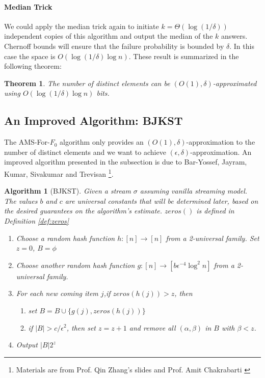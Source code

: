 \documentclass[11pt]{article}
\theoremstyle{plain}
\newtheorem{theorem}{Theorem}[section]
\newtheorem{algorithm}{Algorithm}[section]
\begin{document}
\paragraph{Median Trick}
We could apply the median trick again to initiate $k=\Theta(\log(1/\delta))$ 
independent copies of this algorithm and output the median of the $k$ 
answers. Chernoff bounds will ensure that the failure probability is bounded 
by $\delta$. In this case the space is $O(\log(1/\delta)\log n)$. These result is 
summarized in the following theorem:
\begin{theorem}
The number of distinct elements can be $(O(1),\delta)$-approximated using 
$O(\log(1/\delta)\log n)$ bits.
\end{theorem}

\subsection{An Improved Algorithm: BJKST}
The AMS-For-$F_0$ algorithm only provides an $(O(1),\delta)$-approximation 
to the number of distinct elements and we want to achieve 
$(\epsilon,\delta)$-approximation. An improved algorithm presented in the 
subsection is due to Bar-Yossef, Jayram, Kumar,
Sivakumar and Trevisan  \cite{BJKST02} \footnote{Materials are from Prof. 
Qin Zhang's slides  \cite{zhang2017-slides} and Prof. Amit 
Chakrabarti \cite{Cha2015-notes}}.

\begin{algorithm}[BJKST] Given a stream $\sigma$ assuming 
	vanilla streaming model. The values $b$ and $c$ are universal constants 
	that will be determined later, based on the desired guarantees
	on the algorithm’s estimate. $zeros()$ is defined in 
	Definition  \ref{def:zeros}
	\label{al:bjkst}
	\begin{enumerate}
		\item Choose a random hash function $h : [n] \rightarrow[n]$ from a 
		2-universal family. Set $z = 0$, $B=\phi$
		\item Choose another random hash function $g : [n] 
		\rightarrow[b\epsilon^{-4}\log^2 n]$ from a 2-universal family.
		\item For each new coming item $j$,if $zeros(h(j)) > z$, then 
		\begin{enumerate}
			\item set $B=B\cup\{g(j),zeros(h(j))\}$
			\item if $|B|>c/\epsilon^2$, then set $z=z + 1$ and remove all 
			$(\alpha, \beta)$ in $B$ with $\beta < z$. 
		\end{enumerate}
		\item Output $|B|2^{z}$
	\end{enumerate}
\end{algorithm}
\end{document}
